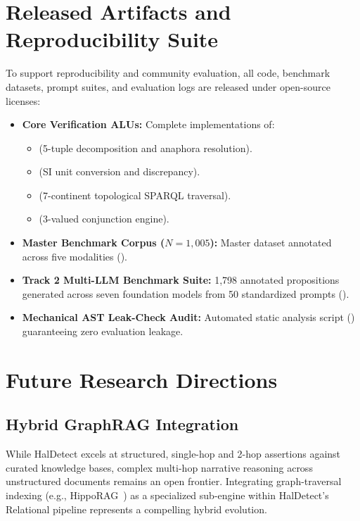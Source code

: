 \section{Released Artifacts and Reproducibility Suite}
\label{sec:released_artifacts}

To support reproducibility and community evaluation, all code, benchmark datasets, prompt suites, and evaluation logs are released under open-source licenses:
\begin{itemize}
    \item \textbf{Core Verification ALUs:} Complete implementations of:
    \begin{itemize}
        \item {} (5-tuple decomposition and anaphora resolution).
        \item {} (SI unit conversion and discrepancy).
        \item {} (7-continent topological SPARQL traversal).
        \item {} (3-valued conjunction engine).
    \end{itemize}
    \item \textbf{Master Benchmark Corpus ($N=1{,}005$):} Master dataset annotated across five modalities ().
    \item \textbf{Track 2 Multi-LLM Benchmark Suite:} 1,798 annotated propositions generated across seven foundation models from 50 standardized prompts ().
    \item \textbf{Mechanical AST Leak-Check Audit:} Automated static analysis script () guaranteeing zero evaluation leakage.
\end{itemize}

\section{Future Research Directions}
\label{sec:future_directions}

\subsection{Hybrid GraphRAG Integration}
While HalDetect excels at structured, single-hop and 2-hop assertions against curated knowledge bases, complex multi-hop narrative reasoning across unstructured documents remains an open frontier. Integrating graph-traversal indexing (e.g., HippoRAG~\cite{gutierrez2024hipporag}) as a specialized sub-engine within HalDetect's Relational pipeline represents a compelling hybrid evolution.

